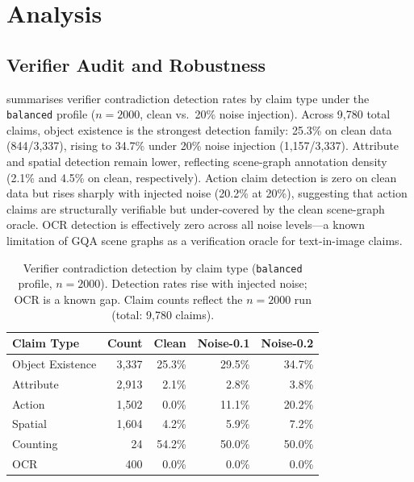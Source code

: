 \section{Analysis}
\label{sec:analysis}

\subsection{Verifier Audit and Robustness}
\label{sec:verifier_audit}

 summarises verifier contradiction detection rates by claim
type under the \texttt{balanced} profile ($n{=}2000$, clean vs.\ 20\% noise
injection). Across 9{,}780 total claims, object existence is the strongest detection
family: 25.3\% on clean data (844/3{,}337), rising to 34.7\% under 20\% noise
injection (1{,}157/3{,}337). Attribute and spatial detection remain lower, reflecting
scene-graph annotation density (2.1\% and 4.5\% on clean, respectively).
Action claim detection is zero on clean data but rises sharply with injected noise
(20.2\% at 20\%), suggesting that action claims are structurally verifiable but
under-covered by the clean scene-graph oracle. OCR detection is effectively zero
across all noise levels---a known limitation of GQA scene graphs as a verification
oracle for text-in-image claims.

\begin{table}[h]
\centering
\caption{Verifier contradiction detection by claim type (\texttt{balanced}
profile, $n{=}2000$). Detection rates rise with injected noise; OCR is a known
gap. Claim counts reflect the $n{=}2000$ run (total: 9{,}780 claims).}
\label{tab:verifier_audit}
\small
\setlength{\tabcolsep}{3.5pt}
\begin{tabular}{lrrrr}
\toprule
\textbf{Claim Type} & \textbf{Count} & \textbf{Clean} & \textbf{Noise-0.1} & \textbf{Noise-0.2} \\
\midrule
Object Existence & 3{,}337 & 25.3\% & 29.5\% & 34.7\% \\
Attribute        & 2{,}913 &  2.1\% &  2.8\% &  3.8\% \\
Action           & 1{,}502 &  0.0\% & 11.1\% & 20.2\% \\
Spatial          & 1{,}604 &  4.2\% &  5.9\% &  7.2\% \\
Counting         &     24  & 54.2\% & 50.0\% & 50.0\% \\
OCR              &    400  &  0.0\% &  0.0\% &  0.0\% \\
\bottomrule
\end{tabular}
\end{table}

